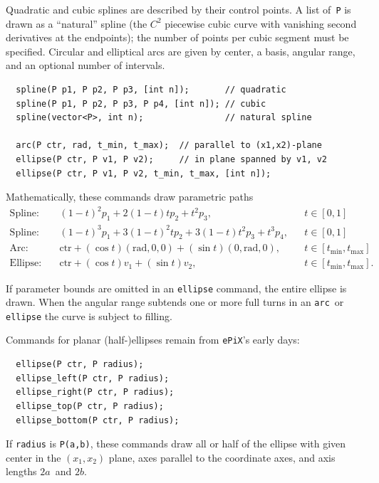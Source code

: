 \documentclass[12pt,letterpaper]{book}
\newcommand{\code}[1]{\texttt{#1}}
\newcommand{\ePiX}{\code{ePiX}}
\newcommand{\texicomment}{}
\newcommand{\texicommentend}{}
\newcommand{\teximath}[1]{$#1$}
\newcommand{\findex}[1]{\ignorespaces}
\begin{document}
Quadratic and cubic splines are described by their control points.  A
list of~\code{P} is drawn as a ``natural'' spline (the \teximath{C^2}
piecewise cubic curve with vanishing second derivatives at the
endpoints); the number of points per cubic segment must be specified.
Circular and elliptical arcs are given by center, a basis, angular
range, and an optional number of intervals.
\findex{spline}
\findex{arc}
\findex{ellipse}
\begin{verbatim}
  spline(P p1, P p2, P p3, [int n]);       // quadratic
  spline(P p1, P p2, P p3, P p4, [int n]); // cubic
  spline(vector<P>, int n);                // natural spline

  arc(P ctr, rad, t_min, t_max);  // parallel to (x1,x2)-plane
  ellipse(P ctr, P v1, P v2);     // in plane spanned by v1, v2
  ellipse(P ctr, P v1, P v2, t_min, t_max, [int n]);
\end{verbatim}
\texicomment
Mathematically, these commands draw parametric paths
\begin{align*}
  \text{Spline:}\quad&(1-t)^2 p_1 + 2(1-t)t p_2 + t^2 p_3,
    && t\in[0,1] \\
  \text{Spline:}\quad&(1-t)^3 p_1 + 3(1-t)^2t p_2 + 3(1-t)t^2 p_3 + t^3p_4,
    && t\in[0,1] \\
  \text{Arc:}\quad&\mathrm{ctr} + (\cos t)(\mathrm{rad},0,0)
                + (\sin t)(0,\mathrm{rad},0),
    && t\in[t_\mathrm{min}, t_\mathrm{max}] \\
  \text{Ellipse:}\quad&\mathrm{ctr} + (\cos t)v_1 + (\sin t)v_2, 
    && t\in[t_\mathrm{min}, t_\mathrm{max}].
\end{align*}
\texicommentend
If parameter bounds are omitted in an \code{ellipse} command, the
entire ellipse is drawn.  When the angular range subtends one or more
full turns in an \code{arc}~or \code{ellipse} the curve is subject to
filling.

Commands for planar (half-)ellipses remain from \ePiX's early days:
\findex{ellipse}
\findex{ellipse\_left}
\findex{ellipse\_right}
\findex{ellipse\_top}
\findex{ellipse\_bottom}
\begin{verbatim}
  ellipse(P ctr, P radius);
  ellipse_left(P ctr, P radius);
  ellipse_right(P ctr, P radius);
  ellipse_top(P ctr, P radius);
  ellipse_bottom(P ctr, P radius);
\end{verbatim}
If \code{radius} is \code{P(a,b)}, these commands draw all or half of
the ellipse with given center in the \teximath{(x_1,x_2)} plane, axes
parallel to the coordinate axes, and axis lengths \teximath{2a}~and
\teximath{2b}.
\end{document}
